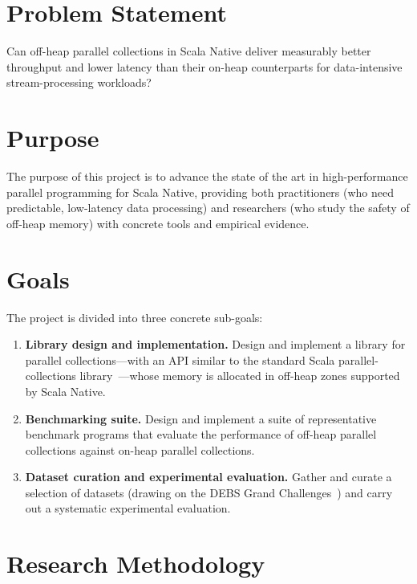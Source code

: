 \documentclass[
  english,   %
  bibtex,    %
]{kththesis}
\begin{document}
\section{Problem Statement}
\label{sec:problem}

Can off-heap parallel collections in Scala Native deliver measurably better
throughput and lower latency than their on-heap counterparts for
data-intensive stream-processing workloads?

\section{Purpose}
\label{sec:purpose}

The purpose of this project is to advance the state of the art in
high-performance parallel programming for Scala Native, providing both
practitioners (who need predictable, low-latency data processing) and
researchers (who study the safety of off-heap memory) with concrete tools
and empirical evidence.

\section{Goals}
\label{sec:goals}

The project is divided into three concrete sub-goals:

\begin{enumerate}
  \item \textbf{Library design and implementation.}  Design and implement a
        library for parallel collections---with an \gls{API} similar to the
        standard Scala parallel-collections library~\cite{prokopec_parallel_2011}---whose
        memory is allocated in off-heap zones supported by Scala Native.

  \item \textbf{Benchmarking suite.}  Design and implement a suite of
        representative benchmark programs that evaluate the performance of
        off-heap parallel collections against on-heap parallel collections.

  \item \textbf{Dataset curation and experimental evaluation.}  Gather and
        curate a selection of datasets (drawing on the \gls{DEBS} Grand
        Challenges~\cite{debs_grand_challenges}) and carry out a systematic
        experimental evaluation.
\end{enumerate}

\section{Research Methodology}
\label{sec:methodology}
\end{document}
